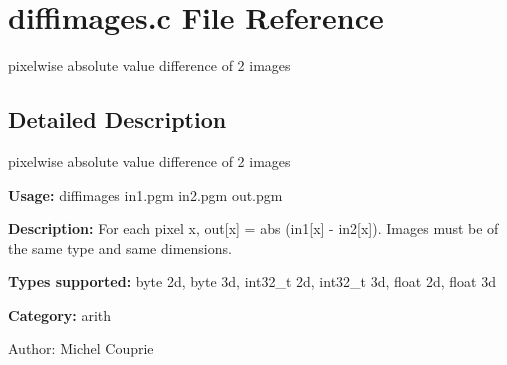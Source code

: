 \section{diffimages.c File Reference}
\label{diffimages_8c}
pixelwise absolute value difference of 2 images 



\subsection{Detailed Description}
pixelwise absolute value difference of 2 images 

{\bf Usage:} diffimages in1.pgm in2.pgm out.pgm

{\bf Description:} For each pixel x, out[x] = abs (in1[x] - in2[x]). Images must be of the same type and same dimensions.

{\bf Types supported:} byte 2d, byte 3d, int32\_\-t 2d, int32\_\-t 3d, float 2d, float 3d

{\bf Category:} arith

\begin{Desc}
\item[Author:]Michel Couprie \end{Desc}
